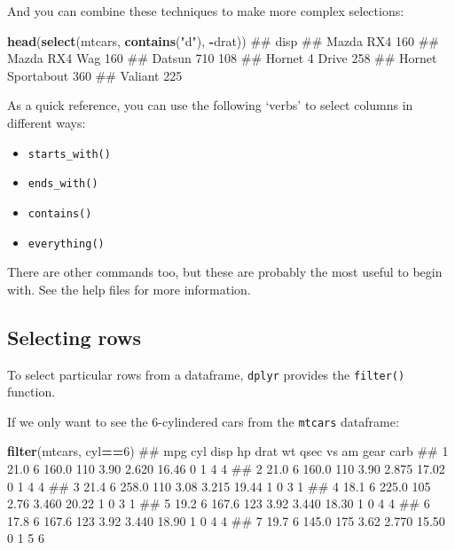 \documentclass[]{article}
\newenvironment{Shaded}{\begin{snugshade}}{\end{snugshade}}
\newcommand{\KeywordTok}[1]{\textcolor[rgb]{0.13,0.29,0.53}{\textbf{#1}}}
\newcommand{\DecValTok}[1]{\textcolor[rgb]{0.00,0.00,0.81}{#1}}
\newcommand{\StringTok}[1]{\textcolor[rgb]{0.31,0.60,0.02}{#1}}
\newcommand{\OperatorTok}[1]{\textcolor[rgb]{0.81,0.36,0.00}{\textbf{#1}}}
\newcommand{\NormalTok}[1]{#1}
\providecommand{\tightlist}{%
  \setlength{\itemsep}{0pt}\setlength{\parskip}{0pt}}
\theoremstyle{definition}
\theoremstyle{definition}
\theoremstyle{definition}
\theoremstyle{remark}
\begin{document}
And you can combine these techniques to make more complex selections:

\begin{Shaded}
\begin{Highlighting}[]
\KeywordTok{head}\NormalTok{(}\KeywordTok{select}\NormalTok{(mtcars, }\KeywordTok{contains}\NormalTok{(}\StringTok{"d"}\NormalTok{), }\OperatorTok{-}\NormalTok{drat))}
\NormalTok{##                   disp}
\NormalTok{## Mazda RX4          160}
\NormalTok{## Mazda RX4 Wag      160}
\NormalTok{## Datsun 710         108}
\NormalTok{## Hornet 4 Drive     258}
\NormalTok{## Hornet Sportabout  360}
\NormalTok{## Valiant            225}
\end{Highlighting}
\end{Shaded}

As a quick reference, you can use the following `verbs' to select
columns in different ways:

\begin{itemize}
\tightlist
\item
  \texttt{starts\_with()}
\item
  \texttt{ends\_with()}
\item
  \texttt{contains()}
\item
  \texttt{everything()}
\end{itemize}

There are other commands too, but these are probably the most useful to
begin with. See the help files for more information.

\hypertarget{selecting-rows}{\subsection*{Selecting
rows}\label{selecting-rows}}

To select particular rows from a dataframe, \texttt{dplyr} provides the
\texttt{filter()} function.

If we only want to see the 6-cylindered cars from the \texttt{mtcars}
dataframe:

\begin{Shaded}
\begin{Highlighting}[]
\KeywordTok{filter}\NormalTok{(mtcars, cyl}\OperatorTok{==}\DecValTok{6}\NormalTok{)}
\NormalTok{##    mpg cyl  disp  hp drat    wt  qsec vs am gear carb}
\NormalTok{## 1 21.0   6 160.0 110 3.90 2.620 16.46  0  1    4    4}
\NormalTok{## 2 21.0   6 160.0 110 3.90 2.875 17.02  0  1    4    4}
\NormalTok{## 3 21.4   6 258.0 110 3.08 3.215 19.44  1  0    3    1}
\NormalTok{## 4 18.1   6 225.0 105 2.76 3.460 20.22  1  0    3    1}
\NormalTok{## 5 19.2   6 167.6 123 3.92 3.440 18.30  1  0    4    4}
\NormalTok{## 6 17.8   6 167.6 123 3.92 3.440 18.90  1  0    4    4}
\NormalTok{## 7 19.7   6 145.0 175 3.62 2.770 15.50  0  1    5    6}
\end{Highlighting}
\end{Shaded}
\end{document}
